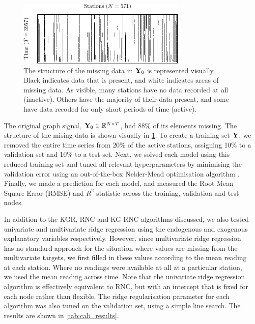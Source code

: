\FloatBarrier

\begin{figure}[h]
    \centering
    \vspace*{1.5cm}
    \includegraphics[width=0.9\linewidth]{Figures/pm25_missing.pdf}
    \vspace*{0.3cm}
    \caption[The structure of the missing data for the pollutant prediction problem]{The structure of the missing data in $\mathbf{Y}_0$ is represented visually. Black indicates data that is present, and white indicates areas of missing data. As visible, many stations have no data recorded at all (inactive). Others have the majority of their data present, and some have data recoded for only short periods of time (active). }
    \label{fig:pm25_missing}
    \vspace*{1.5cm}
\end{figure}

The original graph signal, $\mathbf{Y}_0 \in \mathbb{R}^{N \times T}$, had 88\% of its elements missing. The structure of the mising data is shown visually in \cref{fig:pm25_missing}. To create a training set $\mathbf{Y}$, we removed the entire time series from 20\% of the active stations, assigning 10\% to a validation set and 10\% to a test set. Next, we solved each model using this reduced training set and tuned all relevant hyperparameters by minimising the validation error using an out-of-the-box Nelder-Mead optimisation algorithm \citep{Gao2010}. Finally, we made a prediction for each model, and measured the Root Mean Square Error (RMSE) and $R^2$ statistic across the training, validation and test nodes. 


In addition to the KGR, RNC and KG-RNC algorithms discussed, we also tested univariate and multivariate ridge regression using the endogenous and exogenous explanatory variables respectively. However, since multivariate ridge regression has no standard approach for the situation where values are missing from the multivariate targets, we first filled in these values according to the mean reading at each station. Where no readings were available at all at a particular station, we used the mean reading across time. Note that the univariate ridge regression algorithm is effectively equivalent to RNC, but with an intercept that is fixed for each node rather than flexible. The ridge regularisation parameter for each algorithm was also tuned on the validation set, using a simple line search. The results are shown in \cref{tab:cali_results}. 

